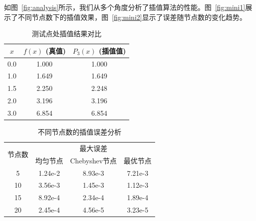 \documentclass{joulabreport}
\begin{document}
如图~\ref{fig:analysis}所示，我们从多个角度分析了插值算法的性能。图~\ref{fig:mini1}展示了不同节点数下的插值效果，图~\ref{fig:mini2}显示了误差随节点数的变化趋势。

\begin{table}[htbp]
\centering
\caption{测试点处插值结果对比}
\label{tab:comparison}
\begin{tabular}{ccc}
\toprule[1.5pt]
$x$ & $f(x)$ (真值) & $P_3(x)$ (插值值) \\
\midrule[0.75pt]
0.0 & 1.000 & 1.000 \\
1.0 & 1.649 & 1.649 \\
1.5 & 2.250 & 2.248 \\
2.0 & 3.196 & 3.196 \\
3.0 & 6.854 & 6.854 \\
\bottomrule[1.5pt]
\end{tabular}
\end{table}

\begin{table}[htbp]
\centering
\caption{不同节点数的插值误差分析}
\label{tab:error_analysis}
\begin{tabular}{c*{3}{c}}
\toprule[1.5pt]
\multirow{2}{*}{节点数} & \multicolumn{3}{c}{最大误差} \\
\cmidrule[0.75pt](lr){2-4}
& 均匀节点 & Chebyshev节点 & 最优节点 \\
\midrule[0.75pt]
5  & 1.24e-2 & 8.93e-3 & 7.21e-3 \\
10 & 3.56e-3 & 1.45e-3 & 1.12e-3 \\
15 & 8.92e-4 & 2.34e-4 & 1.89e-4 \\
20 & 2.45e-4 & 4.56e-5 & 3.23e-5 \\
\bottomrule[1.5pt]
\end{tabular}
\end{table}
\end{document}
